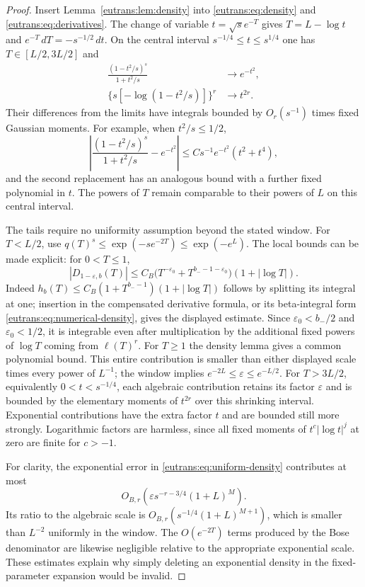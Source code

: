 \begin{proof}
Insert Lemma~\ref{eutrans:lem:density} into
\eqref{eutrans:eq:density} and \eqref{eutrans:eq:derivatives}. The
change of variable $t=\sqrt{s}e^{-T}$ gives $T=L-\log t$ and
$e^{-T}\,dT=-s^{-1/2}\,dt$. On the central interval
$s^{-1/4}\leq t\leq s^{1/4}$ one has $T\in[L/2,3L/2]$ and
\begin{align*}
 \frac{(1-t^2/s)^s}{1+t^2/s}&\longrightarrow e^{-t^2},\\
 \{s[-\log(1-t^2/s)]\}^r&\longrightarrow t^{2r}.
\end{align*}
Their differences from the limits have integrals bounded by
$O_r(s^{-1})$ times fixed Gaussian moments. For example, when
$t^2/s\leq1/2$,
\[
 \left|\frac{(1-t^2/s)^s}{1+t^2/s}-e^{-t^2}\right|
 \leq C s^{-1}e^{-t^2}(t^2+t^4),
\]
and the second replacement has an analogous bound with a further
fixed polynomial in $t$. The powers of $T$ remain comparable to
their powers of $L$ on this central interval.

The tails require no uniformity assumption beyond the stated window.
For $T<L/2$, use $q(T)^s\leq\exp(-s e^{-2T})\leq\exp(-e^L)$.
The local bounds can be made explicit: for $0<T\leq1$,
\[
 |D_{1-\varepsilon,b}(T)|\leq C_B
 \bigl(T^{-\varepsilon_0}+T^{b_--1-\varepsilon_0}\bigr)
                                  (1+|\log T|).
\]
Indeed $h_b(T)\leq C_B(1+T^{b_--1})(1+|\log T|)$ follows by
splitting its integral at one; insertion in the compensated
derivative formula, or its beta-integral form
\eqref{eutrans:eq:numerical-density}, gives the displayed estimate.
Since $\varepsilon_0<b_-/2$ and $\varepsilon_0<1/2$, it is
integrable even after multiplication by the additional fixed powers
of $\log T$ coming from $\ell(T)^r$. For $T\geq1$ the density lemma
gives a common polynomial bound. This entire contribution is smaller
than either displayed scale times every power of $L^{-1}$; the
window implies $e^{-2L}\leq\varepsilon\leq e^{-L/2}$.
For $T>3L/2$, equivalently $0<t<s^{-1/4}$, each algebraic contribution
retains its factor $\varepsilon$ and is bounded by the elementary
moments of $t^{2r}$ over this shrinking interval. Exponential
contributions have the extra factor $t$ and are bounded still more
strongly. Logarithmic factors are harmless, since all fixed moments
of $t^c|\log t|^j$ at zero are finite for $c>-1$.

For clarity, the exponential error in
\eqref{eutrans:eq:uniform-density} contributes at most
\[
 O_{B,r}\left(\varepsilon s^{-r-3/4}(1+L)^M\right).
\]
Its ratio to the algebraic scale is
$O_{B,r}(s^{-1/4}(1+L)^{M+1})$, which is smaller than $L^{-2}$
uniformly in the window. The $O(e^{-2T})$ terms produced by the
Bose denominator are likewise negligible relative to the appropriate
exponential scale. These estimates explain why simply deleting an
exponential density in the fixed-parameter expansion would be invalid.


\end{proof}
